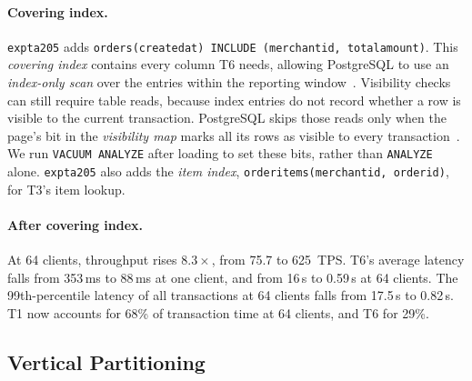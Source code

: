 \documentclass[sigconf,10pt,nonacm]{acmart}
\newcommand{\expt}[1]{\texttt{expt\textunderscore #1}}
\renewcommand{\_}{\underscorewithoutbreak\allowbreak}
\begin{document}
\paragraph{Covering index.} \expt{a205} adds
\texttt{orders(created\_at) INCLUDE (merchant\_id, total\_amount)}. This
\emph{covering index} contains every column T6 needs, allowing PostgreSQL to use
an \emph{index-only scan} over the entries within the reporting window~\cite{pgindexonly}.
Visibility checks can still require table reads, because index entries do not
record whether a row is visible to the current transaction. PostgreSQL skips
those reads only when the page's bit in the \emph{visibility map} marks all its
rows as visible to every transaction~\cite{pgvisibilitymap}. We run
\texttt{VACUUM ANALYZE} after loading to set these bits, rather than
\texttt{ANALYZE} alone. \expt{a205} also adds the \emph{item index},
\texttt{order\_items(merchant\_id, order\_id)}, for T3's item lookup.

\paragraph{After covering index.} At 64 clients, throughput rises $8.3\times$, from
75.7 to 625~TPS. T6's average latency falls from 353\,ms to 88\,ms at one client, and
from 16\,s to 0.59\,s at 64 clients. The 99th-percentile latency of all transactions
at 64 clients falls from 17.5\,s to 0.82\,s. T1 now accounts for 68\% of transaction
time at 64 clients, and T6 for 29\%.

\subsection{Vertical Partitioning}
\label{sec:vertical-partitioning}
\end{document}
